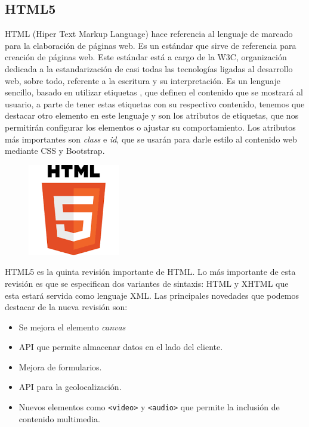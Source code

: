 \documentclass[a4paper, 12pt]{book}
\begin{document}
\subsection{HTML5}
\label{sec:html}
HTML (Hiper Text Markup Language) hace referencia al lenguaje de marcado para la elaboración de páginas web. Es un estándar que sirve de referencia para creación de páginas web. Este estándar está a cargo de la W3C, organización dedicada a la estandarización de casi todas las tecnologías ligadas al desarrollo web, sobre todo, referente a la escritura y su interpretación. Es un lenguaje sencillo, basado en utilizar etiquetas , que definen el contenido que se mostrará al usuario, a parte de tener estas etiquetas con su respectivo contenido, tenemos  que destacar otro elemento en este lenguaje y son los atributos de etiquetas, que nos permitirán configurar los elementos o ajustar su comportamiento. Los atributos más importantes son \emph{class} e \emph{id}, que se usarán para darle estilo al contenido web mediante CSS y Bootstrap. \\
\begin{figure}[H]
    \centering
    \includegraphics[scale=0.8]{img/logo_html5.png}
\end{figure}
HTML5 es la quinta revisión importante de HTML. Lo más importante de esta revisión es que se especifican dos variantes de sintaxis: HTML y XHTML que esta estará servida como lenguaje XML. Las principales novedades que podemos destacar de la nueva revisión son:
\begin{itemize}
    \item Se mejora el elemento \emph{canvas}
    \item API que permite almacenar datos en el lado del cliente.
    \item Mejora de formularios.
    \item API para la geolocalización.
    \item Nuevos elementos como \texttt{<video>} y \texttt{<audio>} que permite la inclusión de contenido multimedia.
\end{itemize}
    
\end{document}
